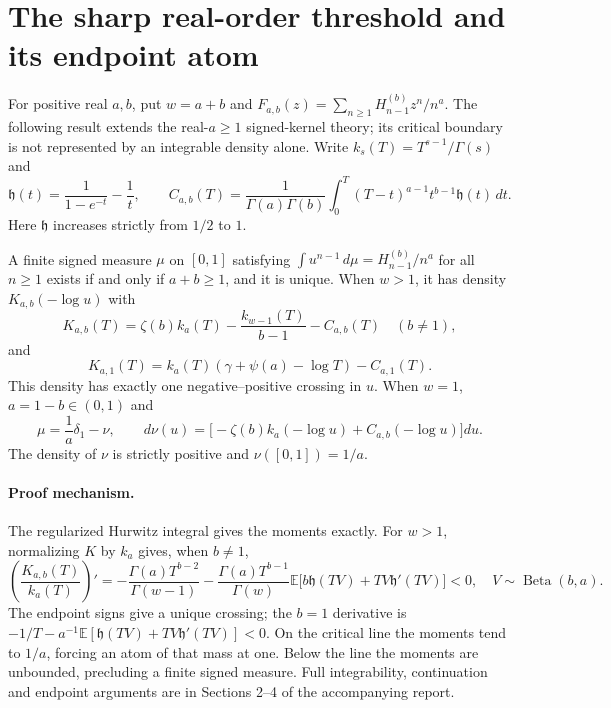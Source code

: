 \section{The sharp real-order threshold and its endpoint atom}
\label{realorder:sec:threshold}

For positive real $a,b$, put $w=a+b$ and
$F_{a,b}(z)=\sum_{n\ge1}H_{n-1}^{(b)}z^n/n^a$.
The following result extends the real-$a\ge1$ signed-kernel theory;
its critical boundary is not represented by an integrable density alone.
Write $k_s(T)=T^{s-1}/\Gamma(s)$ and
\[
 \mathfrak h(t)=\frac1{1-e^{-t}}-\frac1t,\qquad
 C_{a,b}(T)=\frac1{\Gamma(a)\Gamma(b)}
 \int_0^T(T-t)^{a-1}t^{b-1}\mathfrak h(t)\,dt.
\]
Here $\mathfrak h$ increases strictly from $1/2$ to $1$.

\begin{theorem}
\label{realorder:thm:threshold}
A finite signed measure $\mu$ on $[0,1]$ satisfying
$\int u^{n-1}\,d\mu=H_{n-1}^{(b)}/n^a$ for all $n\ge1$ exists
if and only if $a+b\ge1$, and it is unique.
When $w>1$, it has density $K_{a,b}(-\log u)$ with
\[
 K_{a,b}(T)=\zeta(b)k_a(T)-\frac{k_{w-1}(T)}{b-1}-C_{a,b}(T)
 \quad(b\ne1),
\]
and
\[
 K_{a,1}(T)=k_a(T)(\gamma+\psi(a)-\log T)-C_{a,1}(T).
\]
This density has exactly one negative--positive crossing in $u$.
When $w=1$, $a=1-b\in(0,1)$ and
\[
 \mu=\frac1a\delta_1-\nu,\qquad
 d\nu(u)=\bigl[-\zeta(b)k_a(-\log u)+C_{a,b}(-\log u)\bigr]du.
\]
The density of $\nu$ is strictly positive and $\nu([0,1])=1/a$.
\end{theorem}

\paragraph{Proof mechanism.}
The regularized Hurwitz integral gives the moments exactly. For $w>1$,
normalizing $K$ by $k_a$ gives, when $b\ne1$,
\[
 \left(\frac{K_{a,b}(T)}{k_a(T)}\right)'
 =-\frac{\Gamma(a)T^{b-2}}{\Gamma(w-1)}
 -\frac{\Gamma(a)T^{b-1}}{\Gamma(w)}
   \mathbb E\bigl[b\mathfrak h(TV)+TV\mathfrak h'(TV)\bigr]<0,
 \quad V\sim\operatorname{Beta}(b,a).
\]
The endpoint signs give a unique crossing; the $b=1$ derivative is
$-1/T-a^{-1}\mathbb E[\mathfrak h(TV)+TV\mathfrak h'(TV)]<0$.
On the critical line the moments tend to $1/a$, forcing an atom of
that mass at one. Below the line the moments are unbounded, precluding
a finite signed measure. Full integrability, continuation and endpoint
arguments are in Sections 2--4 of the accompanying report.

